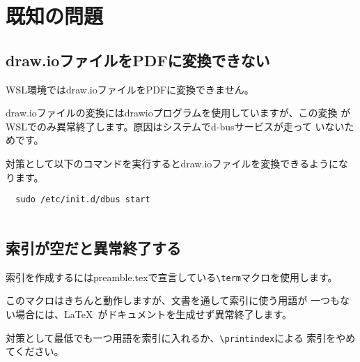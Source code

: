 \chapter{既知の問題}
\label{sec:appendix10}

\section{draw.ioファイルをPDFに変換できない}
WSL環境ではdraw.ioファイルをPDFに変換できません。

draw.ioファイルの変換にはdrawioプログラムを使用していますが、この変換
がWSLでのみ異常終了します。原因はシステムでd-busサービスが走って
いないためです。

対策として以下のコマンドを実行するとdraw.ioファイルを変換できるようになります。

\begin{lstlisting}
  sudo /etc/init.d/dbus start
  
\end{lstlisting}

\section{索引が空だと異常終了する}
索引を作成するにはpreamble.texで宣言している\lstinline{\term}マクロを使用します。

このマクロはきちんと動作しますが、文書を通して索引に使う用語が
一つもない場合には、\LaTeX\ がドキュメントを生成せず異常終了します。

対策として最低でも一つ用語を索引に入れるか、\lstinline{\printindex}による
索引をやめてください。

